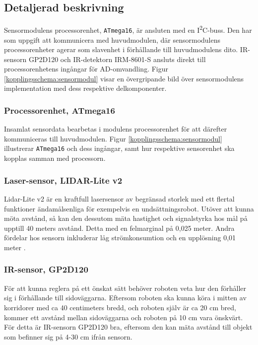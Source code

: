 \documentclass[11pt]{article}
\begin{document}
\begin{flushleft}
\begin{itemize}
\end{itemize}

\subsection{Detaljerad beskrivning}

Sensormodulens processorenhet, \verb+ATmega16+, är ansluten med en I\textsuperscript{2}C-buss. Den har som uppgift att kommunicera med huvudmodulen, där sensormodulens processorenheter agerar som slavenhet i förhållande till huvudmodulens dito. 
IR-sensorn GP2D120 och IR-detektorn IRM-8601-S ansluts direkt till processorenhetens ingångar för AD-omvandling. Figur \ref{kopplingsschema:sensormodul} visar en övergripande bild över sensormodulens implementation med dess respektive delkomponenter. 

\subsubsection{Processorenhet, ATmega16}
Insamlat sensordata bearbetas i modulens processorenhet för att därefter kommuniceras till huvudmodulen. Figur \ref{kopplingsschema:sensormodul} illustrerar \verb+ATmega16+ och dess ingångar, samt hur respektive sensorenhet ska kopplas samman med processorn. 

\subsubsection{Laser-sensor, LIDAR-Lite v2}
Lidar-Lite v2 är en kraftfull lasersensor av begränsad storlek med ett flertal funktioner ändamålsenliga för exempelvis en undsättningsrobot. Utöver att kunna möta avstånd, så kan den dessutom mäta hastighet och signalstyrka hos mål på upptill 40 meters avstånd. Detta med en felmarginal på 0,025 meter. Andra fördelar hos sensorn inkluderar låg strömkonsumtion och en upplösning 0,01 meter \cite{7131685}.


\subsubsection{IR-sensor, GP2D120}
För att kunna reglera på ett önskat sätt behöver roboten veta hur den förhåller sig i förhållande till sidoväggarna. Eftersom roboten ska kunna köra i mitten av korridorer med ca 40 centimeters bredd, och roboten själv är ca 20 cm bred, kommer ett avstånd mellan sidoväggarna och roboten på 10 cm vara önskvärt. För detta är IR-sensorn GP2D120 bra, eftersom den kan mäta avstånd till objekt som befinner sig på 4-30 cm ifrån sensorn. 


\end{flushleft}
\end{document}
